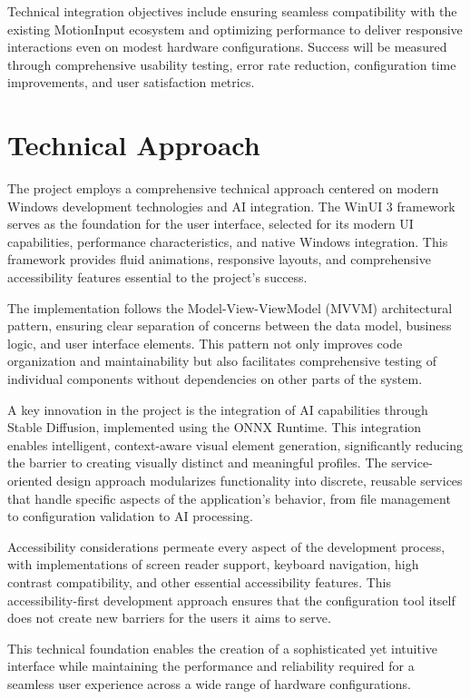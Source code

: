 Technical integration objectives include ensuring seamless compatibility with the existing MotionInput ecosystem and optimizing performance to deliver responsive interactions even on modest hardware configurations. Success will be measured through comprehensive usability testing, error rate reduction, configuration time improvements, and user satisfaction metrics.

\section{Technical Approach}
The project employs a comprehensive technical approach centered on modern Windows development technologies and AI integration. The WinUI 3 framework serves as the foundation for the user interface, selected for its modern UI capabilities, performance characteristics, and native Windows integration. This framework provides fluid animations, responsive layouts, and comprehensive accessibility features essential to the project's success.

The implementation follows the Model-View-ViewModel (MVVM) architectural pattern, ensuring clear separation of concerns between the data model, business logic, and user interface elements. This pattern not only improves code organization and maintainability but also facilitates comprehensive testing of individual components without dependencies on other parts of the system.

A key innovation in the project is the integration of AI capabilities through Stable Diffusion, implemented using the ONNX Runtime. This integration enables intelligent, context-aware visual element generation, significantly reducing the barrier to creating visually distinct and meaningful profiles. The service-oriented design approach modularizes functionality into discrete, reusable services that handle specific aspects of the application's behavior, from file management to configuration validation to AI processing.

Accessibility considerations permeate every aspect of the development process, with implementations of screen reader support, keyboard navigation, high contrast compatibility, and other essential accessibility features. This accessibility-first development approach ensures that the configuration tool itself does not create new barriers for the users it aims to serve.

This technical foundation enables the creation of a sophisticated yet intuitive interface while maintaining the performance and reliability required for a seamless user experience across a wide range of hardware configurations.

